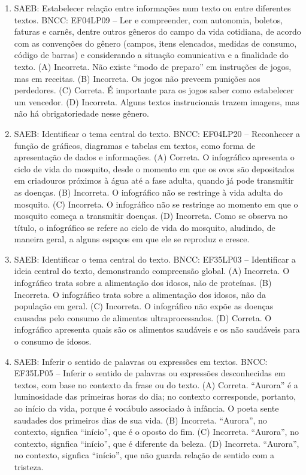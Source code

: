 \begin{enumerate}
\item
SAEB: Estabelecer relação entre informações num texto ou entre diferentes textos. BNCC: EF04LP09 -- Ler e compreender, com autonomia, boletos, faturas e carnês, dentre outros gêneros do campo da vida cotidiana, de acordo com as convenções do gênero (campos, itens elencados, medidas de consumo, código de barras) e considerando a situação comunicativa e a finalidade do texto. 
(A) Incorreta. Não existe ``modo de preparo'' em instruções de jogos, mas em receitas. 
(B) Incorreta. Os jogos não preveem punições aos perdedores. 
(C) Correta. É importante para os jogos saber como estabelecer um vencedor. 
(D) Incorreta. Alguns textos instrucionais trazem imagens, mas não há obrigatoriedade nesse gênero.

\item
SAEB: Identificar o tema central do texto. BNCC: EF04LP20 -- Reconhecer a função de gráficos, diagramas e tabelas em textos, como forma de apresentação de dados e informações. 
(A) Correta. O infográfico apresenta o ciclo de vida do mosquito, desde o momento em que os ovos são depositados em criadouros próximos à água até a fase adulta, quando já pode transmitir as doenças. 
(B) Incorreta. O infográfico não se restringe à vida adulta do mosquito. 
(C) Incorreta. O infográfico não se restringe ao momento em que o mosquito começa a transmitir doenças. 
(D) Incorreta. Como se observa no título, o infográfico se refere ao ciclo de vida do mosquito, aludindo, de maneira geral, a alguns espaços em que ele se reproduz e cresce.

\item
SAEB: Identificar o tema central do texto. BNCC: EF35LP03 -- Identificar a ideia central do texto, demonstrando compreensão global. 
(A) Incorreta. O infográfico trata sobre a alimentação dos idosos, não de proteínas. 
(B) Incorreta. O infográfico trata sobre a alimentação dos idosos, não da população em geral. 
(C) Incorreta. O infográfico não expõe as doenças causadas pelo consumo de alimentos ultraprocessados. 
(D) Correta. O infográfico apresenta quais são os alimentos saudáveis e os não saudáveis para o consumo de idosos.

\item
SAEB: Inferir o sentido de palavras ou expressões em textos. BNCC: EF35LP05 -- Inferir o sentido de palavras ou expressões desconhecidas em textos, com base no contexto da frase ou do texto. 
(A) Correta. ``Aurora'' é a luminosidade das primeiras horas do dia; no contexto corresponde, portanto, ao início da vida, porque é vocábulo associado à infância. O poeta sente saudades dos primeiros dias de sua vida. 
(B) Incorreta. ``Aurora'', no contexto, signfica ``início'', que é o oposto do fim. 
(C) Incorreta.  ``Aurora'', no contexto, signfica ``início'', que é diferente da beleza. 
(D) Incorreta. ``Aurora'', no contexto, signfica ``início'', que não guarda relação de sentido com a tristeza.


\end{enumerate}
